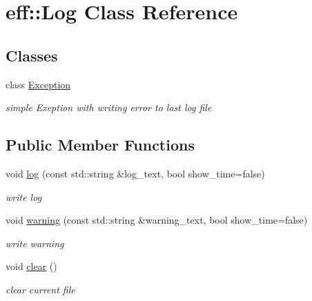 \hypertarget{classeff_1_1Log}{}\section{eff\+:\+:Log Class Reference}
\label{classeff_1_1Log}
\subsection*{Classes}
\begin{DoxyCompactItemize}
\item 
class \mbox{\hyperlink{classeff_1_1Log_1_1Exception}{Exception}}
\begin{DoxyCompactList}\small\item\em simple Exeption with writing error to last log file \end{DoxyCompactList}\end{DoxyCompactItemize}
\subsection*{Public Member Functions}
\begin{DoxyCompactItemize}
\item 
\mbox{\label{classeff_1_1Log_a8e90a7d29ec8b65186d009b9b883b774}} 
void \mbox{\hyperlink{classeff_1_1Log_a8e90a7d29ec8b65186d009b9b883b774}{log}} (const std\+::string \&log\+\_\+text, bool show\+\_\+time=false)
\begin{DoxyCompactList}\small\item\em write log \end{DoxyCompactList}\item 
\mbox{\label{classeff_1_1Log_a7c3e86bcd7ab4b9370b148b2ae6b63eb}} 
void \mbox{\hyperlink{classeff_1_1Log_a7c3e86bcd7ab4b9370b148b2ae6b63eb}{warning}} (const std\+::string \&warning\+\_\+text, bool show\+\_\+time=false)
\begin{DoxyCompactList}\small\item\em write warning \end{DoxyCompactList}\item 
\mbox{\label{classeff_1_1Log_a5a50ce8ed135a05f9054932cffc959d0}} 
void \mbox{\hyperlink{classeff_1_1Log_a5a50ce8ed135a05f9054932cffc959d0}{clear}} ()
\begin{DoxyCompactList}\small\item\em clear current file \end{DoxyCompactList}\end{DoxyCompactItemize}
